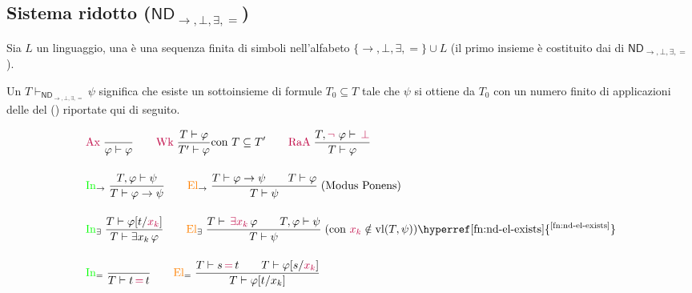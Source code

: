 \subsection{\texorpdfstring{Sistema ridotto ($\mathsf{ND}_{\to, \bot, \exists, =}$)}{Sistema ridotto (ND→,⊥,∃,=)}}

\begin{definition}[Formula in $\mathsf{ND}_{\to, \bot, \exists, =}$]
    Sia $L$ un linguaggio, una  è una sequenza finita di simboli nell'alfabeto $\{\to, \bot, \exists, =\} \cup L$ (il primo insieme è costituito dai  di $\mathsf{ND}_{\to, \bot, \exists, =}$).
\end{definition}

\begin{definition}[Sequente in $\mathsf{ND}_{\to, \bot, \exists, =}$]
    Un  $T \vdash_{\mathsf{ND}_{\to, \bot, \exists, =}} \psi$ significa che esiste un sottoinsieme di formule $T_0 \subseteq T$ tale che
    $\psi$ si ottiene da $T_0$ con un numero finito di applicazioni delle  del  () riportate qui di seguito.
\end{definition}

\[
\begingroup
\renewcommand{\arraystretch}{1.8}
\begin{array}{l}
\textcolor{purple}{\mathrm{Ax}}\;\displaystyle\frac{}{\varphi \vdash \varphi}
\qquad
\textcolor{purple}{\mathrm{Wk}}\;\displaystyle\frac{T \vdash \varphi}{T' \vdash \varphi}\text{con $T \subseteq T'$}
\qquad
\purple{\mathrm{RaA}}\;\displaystyle\frac{T, \purple{\neg \,}\, \varphi \vdash \,\purple{\bot}}{T \vdash \varphi}
\\[4ex]
\textcolor{green}{\mathrm{In}}_{\to}\;\displaystyle\frac{T, \varphi \vdash \psi}{T \vdash \varphi \to \psi}
\qquad
\textcolor{orange}{\mathrm{El}}_{\to}\;\displaystyle\frac{T \vdash \varphi \to \psi \qquad T \vdash \varphi}{T \vdash \psi}\;\text{(Modus Ponens)}
\\[4ex]
\textcolor{green}{\mathrm{In}}_{\exists}\;\displaystyle\frac{T \vdash \varphi[t/\purple{x_k}]}{T \vdash \exists x_k\,\varphi}
\qquad
\textcolor{orange}{\mathrm{El}}_{\exists}\;\displaystyle\frac{T \vdash \, \textcolor{purple}{\exists x_k}\, \varphi \qquad T, \varphi \vdash \psi}{T \vdash \psi}\;\text{(con }\textcolor{purple}{x_k} \notin \vl(T, \psi)\text{)}\text{\hyperref[fn:nd-el-exists]{\textsuperscript{\ref*{fn:nd-el-exists}}}}
\\[4ex]
\textcolor{green}{\mathrm{In}}_{=}\;\displaystyle\frac{\vphantom{T}}{T \vdash t \,\purple{=}\, t}
\qquad
\textcolor{orange}{\mathrm{El}}_{=}\;\displaystyle\frac{T \vdash s \,\purple{=}\, t \qquad T \vdash \varphi[s/\purple{x_k}]}{T \vdash \varphi[t/x_k]}
\end{array}
\endgroup
\]

